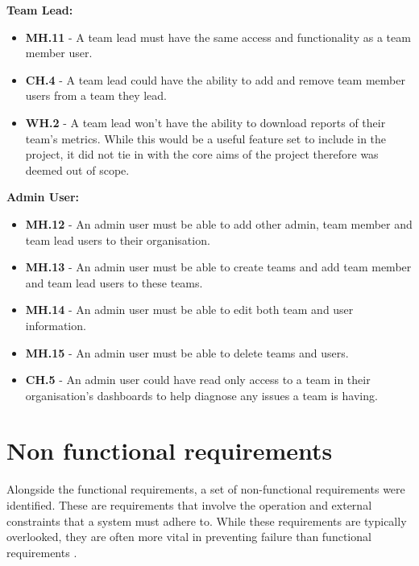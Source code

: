 \documentclass[l4proj.tex]{subfiles}
\begin{document}
\textbf{Team Lead:}
\begin{itemize}
    \item \textbf{MH.11} -  A team lead must have the same access and functionality as a team member user. \\

    \item \textbf{CH.4} - A team lead could have the ability to add and remove team member users from a team they lead. \\

    \item \textbf{WH.2} - A team lead won't have the ability to download reports of their team's metrics. While this would be a useful feature set to include in the project, it did not tie in with the core aims of the project therefore was deemed out of scope.
\end{itemize}
\hfill

\textbf{Admin User:}
\begin{itemize}
    \item \textbf{MH.12} - An admin user must be able to add other admin, team member and team lead users to their organisation. 
    \item \textbf{MH.13} - An admin user must be able to create teams and add team member and team lead users to these teams. 
    \item \textbf{MH.14} - An admin user must be able to edit both team and user information.\\
    \item \textbf{MH.15} - An admin user must be able to delete teams and users.\\

    \item \textbf{CH.5} - An admin user could have read only access to a team in their organisation's dashboards to help diagnose any issues a team is having.\\

\end{itemize}

\section{Non functional requirements}
Alongside the functional requirements, a set of non-functional requirements were identified. These are requirements that involve the operation and external constraints that a system must adhere to. While these requirements are typically overlooked, they are often more vital in preventing failure than functional requirements \cite{Mairiza2010}.
\end{document}
